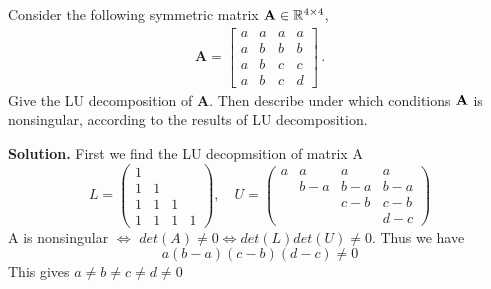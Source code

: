 \documentclass[english,onecolumn]{IEEEtran}
\begin{document}
\noindent Consider the following symmetric matrix ${\bf A}\in \mathbb{R}^{4\times 4}$,
	\begin{align*}
		\mathbf{A}=
		\begin{bmatrix}
			a&a&a&a\\
			a&b&b&b\\
			a&b&c&c\\
			a&b&c&d
		\end{bmatrix}\,.
	\end{align*}
Give the LU decomposition of $\mathbf{A}$.
Then describe under which conditions $\bf{A}$ is nonsingular, according to the results of LU decomposition.

\noindent \textbf{Solution.}
First we find the LU decopmsition of matrix A
$$L=\begin{pmatrix}
1 &  &  &  \\ 
1 & 1 &  &  \\ 
1 & 1 & 1 &  \\ 
1 & 1 & 1 & 1
\end{pmatrix},\quad U = \begin{pmatrix}
a & a & a & a \\ 
& b-a & b-a & b-a \\ 
&  & c-b & c-b \\ 
&  &  & d-c
\end{pmatrix}  $$
A is nonsingular $\Leftrightarrow$ $det(A)\ne 0 \Leftrightarrow det(L)det(U)\ne 0$. Thus we have
$$a(b-a)(c-b)(d-c) \ne 0$$
This gives $a\ne b \ne c \ne d \ne 0$
\end{document}
